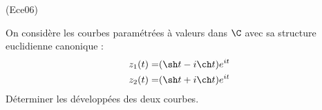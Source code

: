 \begin{tiny}(Ece06)\end{tiny} On considère les courbes paramétrées à valeurs dans $\C$ avec sa structure euclidienne canonique :
\begin{displaymath}
 \begin{aligned}
  z_1(t) =& (\sh t - i \ch t) e^{it}\\
  z_2(t) =& (\sh t + i \ch t) e^{it}\\
 \end{aligned}
\end{displaymath}
Déterminer les développées des deux courbes.

